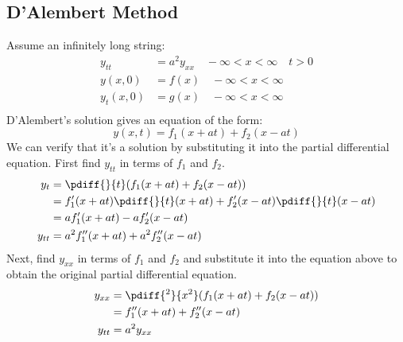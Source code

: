 \documentclass{math}
\begin{document}
\subsection*{D'Alembert Method}
Assume an infinitely long string:
\begin{align*}
  y_{tt} &= a^2y_{xx} \quad -\infty<x<\infty \quad t>0 \\
  y(x,0) &= f(x) \quad -\infty<x<\infty \\
  y_t(x,0) &= g(x) \quad -\infty<x<\infty \\
\end{align*}
D'Alembert's solution gives an equation of the form:
\[ y(x,t) = f_1(x+at)+f_2(x-at) \]
We can verify that it's a solution by substituting it into the partial
differential equation. First find \( y_{tt} \) in terms of \( f_1 \) and
\( f_2 \).
\begin{align*}
  y_t &= \pdiff{}{t}(f_1(x+at)+f_2(x-at)) \\
  &= f_1'(x+at)\pdiff{}{t}(x+at)+f_2'(x-at)\pdiff{}{t}(x-at) \\
  &= af_1'(x+at)-af_2'(x-at) \\
  y_{tt} &= a^2f_1''(x+at)+a^2f_2''(x-at)
\end{align*}
Next, find \( y_{xx} \) in terms of \( f_1 \) and \( f_2 \) and substitute it
into the equation above to obtain the original partial differential equation.
\begin{align*}
  y_{xx} &= \pdiff{^2}{x^2}(f_1(x+at)+f_2(x-at)) \\
  &= f_1''(x+at)+f_2''(x-at) \\
  y_{tt} &= a^2y_{xx}
\end{align*}
\end{document}
